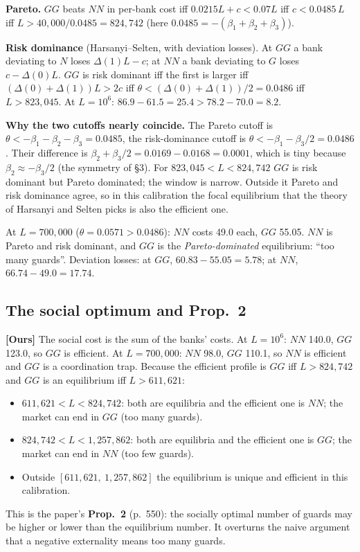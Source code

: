 \documentclass[11pt,a4paper]{article}
\newcommand{\ours}{\textbf{[Ours]}}
\newcommand{\Dl}{\Delta}
\begin{document}
\textbf{Pareto.} $GG$ beats $NN$ in per-bank cost iff $0.0215L+c<0.07L$ iff $c<0.0485\,L$ iff $L>40{,}000/0.0485=824{,}742$
(here $0.0485=-(\beta_1+\beta_2+\beta_3)$).

\textbf{Risk dominance} (Harsanyi--Selten, with deviation losses). At $GG$ a bank deviating to $N$ loses
$\Dl(1)L-c$; at $NN$ a bank deviating to $G$ loses $c-\Dl(0)L$. $GG$ is risk dominant iff the first is larger iff
$(\Dl(0)+\Dl(1))L>2c$ iff $\theta<(\Dl(0)+\Dl(1))/2=0.0486$ iff $L>823{,}045$. At $L=10^6$: $86.9-61.5=25.4>78.2-70.0=8.2$.

\textbf{Why the two cutoffs nearly coincide.} The Pareto cutoff is $\theta<-\beta_1-\beta_2-\beta_3=0.0485$, the
risk-dominance cutoff is $\theta<-\beta_1-\beta_3/2=0.0486$. Their difference is $\beta_2+\beta_3/2=0.0169-0.0168=0.0001$,
which is tiny because $\beta_2\approx-\beta_3/2$ (the symmetry of \S3). For $823{,}045<L<824{,}742$ $GG$ is risk
dominant but Pareto dominated; the window is narrow. Outside it Pareto and risk dominance agree, so in this
calibration the focal equilibrium that the theory of Harsanyi and Selten picks is also the efficient one.

At $L=700{,}000$ ($\theta=0.0571>0.0486$): $NN$ costs 49.0 each, $GG$ 55.05. $NN$ is Pareto and risk
dominant, and $GG$ is the \emph{Pareto-dominated} equilibrium: ``too many guards''. Deviation losses: at $GG$,
$60.83-55.05=5.78$; at $NN$, $66.74-49.0=17.74$.

\subsection{The social optimum and Prop.\ 2}
\ours{} The social cost is the sum of the banks' costs. At $L=10^6$: $NN$ 140.0, $GG$ 123.0, so $GG$ is
efficient. At $L=700{,}000$: $NN$ 98.0, $GG$ 110.1, so $NN$ is efficient and $GG$ is a coordination trap.
Because the efficient profile is $GG$ iff $L>824{,}742$ and $GG$ is an equilibrium iff $L>611{,}621$:
\begin{itemize}
  \item $611{,}621<L<824{,}742$: both are equilibria and the efficient one is $NN$; the market can end in $GG$
        (too many guards).
  \item $824{,}742<L<1{,}257{,}862$: both are equilibria and the efficient one is $GG$; the market can end in $NN$
        (too few guards).
  \item Outside $[611{,}621,\ 1{,}257{,}862]$ the equilibrium is unique and efficient in this calibration.
\end{itemize}
This is the paper's \textbf{Prop.\ 2} (p.\ 550): the socially optimal number of guards may be higher or lower than
the equilibrium number. It overturns the naive argument that a negative externality means too many guards.
\end{document}
